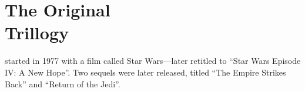 
\part[The Original Trillogy]{The Original\\Trillogy}
	\label{part:original-trillogy}%



 started in 1977 with a film called Star Wars---later retitled to ``Star Wars Episode IV: A New Hope''.  Two sequels were later released, titled ``The Empire Strikes Back'' and ``Return of the Jedi''.


